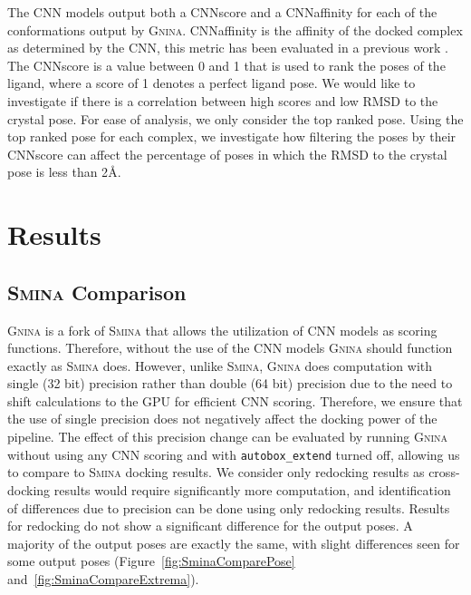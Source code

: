 \documentclass[linenumbers,doublespacing]{bmcart}
\begin{document}
The CNN models output both a CNNscore and a CNNaffinity for each of the conformations output by \textsc{Gnina}. CNNaffinity is the affinity of the docked complex as determined by the CNN, this metric has been evaluated in a previous work \cite{francoeur2020three}. The CNNscore is a value between 0 and 1 that is used to rank the poses of the ligand, where a score of 1 denotes a perfect ligand pose. We would like to investigate if there is a correlation between high scores and low RMSD to the crystal pose. For ease of analysis, we only consider the top ranked pose. Using the top ranked pose for each complex, we investigate how filtering the poses by their CNNscore can affect the percentage of poses in which the RMSD to the crystal pose is less than 2{\AA}.

\section{Results}
\subsection{{\normalfont\scshape Smina} Comparison}
\textsc{Gnina} is a fork of \textsc{Smina} that allows the utilization of CNN models as scoring functions. Therefore, without the use of the CNN models \textsc{Gnina} should function exactly as \textsc{Smina} does. However, unlike \textsc{Smina}, \textsc{Gnina} does computation with single (32 bit) precision rather than double (64 bit) precision due to the need to shift calculations to the GPU for efficient CNN scoring. Therefore, we ensure that the use of single precision does not negatively affect the docking power of the pipeline. The effect of this precision change can be evaluated by running \textsc{Gnina} without using any CNN scoring and with \texttt{autobox\_extend} turned off, allowing us to compare to \textsc{Smina} docking results. We consider only redocking results as cross-docking results would require significantly more computation, and identification of differences due to precision can be done using only redocking results. Results for redocking do not show a significant difference for the output poses. A majority of the output poses are exactly the same, with slight differences seen for some output poses (Figure~\ref{fig:SminaComparePose} and~\ref{fig:SminaCompareExtrema}).
\end{document}
